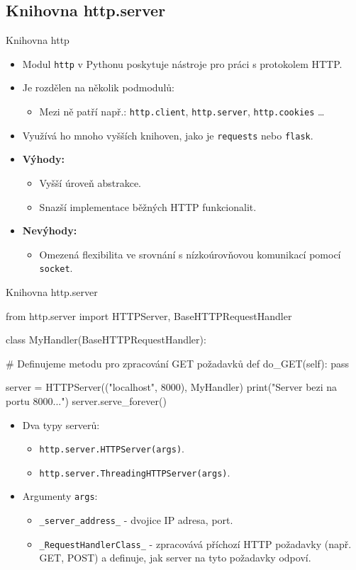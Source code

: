 \documentclass{beamer}
\begin{document}
\subsection{Knihovna http.server}
\begin{frame}{Knihovna http}
	\begin{itemize}
		\item Modul \texttt{http} v Pythonu poskytuje nástroje pro práci s protokolem HTTP.
		\item Je rozdělen na několik podmodulů:
		\begin{itemize}
			\item Mezi ně patří např.: \texttt{http.client}, \texttt{http.server}, \texttt{http.cookies} \ldots
		\end{itemize}
		\item Využívá ho mnoho vyšších knihoven, jako je \texttt{requests} nebo \texttt{flask}.
		\item \textbf{Výhody:}
		\begin{itemize}
			\item Vyšší úroveň abstrakce.
			\item Snazší implementace běžných HTTP funkcionalit.
		\end{itemize}
		\item \textbf{Nevýhody:}
		\begin{itemize}
			\item Omezená flexibilita ve srovnání s nízkoúrovňovou komunikací pomocí \texttt{socket}.
		\end{itemize}
	\end{itemize}	
\end{frame}
\begin{frame}{Knihovna http.server}
    \begin{semiverbatim}
	from http.server import HTTPServer, BaseHTTPRequestHandler

	class MyHandler(BaseHTTPRequestHandler):

		# Definujeme metodu pro zpracování GET požadavků
		def do_GET(self):
			pass

	server = HTTPServer(("localhost", 8000), MyHandler)
	print("Server bezi na portu 8000...")
	server.serve_forever()
    \end{semiverbatim}

	\begin{itemize}
		\item Dva typy serverů:
		\begin{itemize}
			\item \texttt{http.server.HTTPServer(args)}.
			\item \texttt{http.server.ThreadingHTTPServer(args)}.
		\end{itemize}
		\item Argumenty \texttt{args}:
		\begin{itemize}
			\item \texttt{_server_address_} - dvojice IP adresa, port.
			\item \texttt{_RequestHandlerClass_} - zpracovává příchozí HTTP požadavky (např. GET, POST) a definuje, jak server na tyto požadavky odpoví.
		\end{itemize}
	\end{itemize}	
\end{frame}
\end{document}
